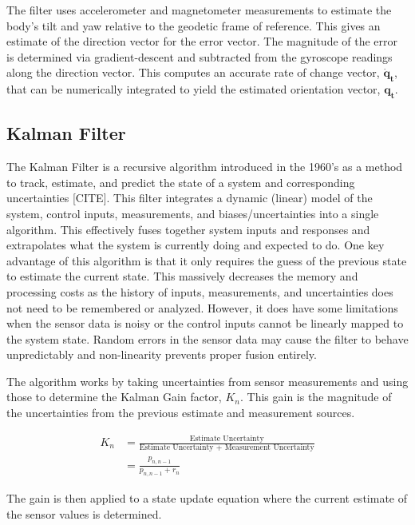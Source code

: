 The filter uses accelerometer and magnetometer measurements to estimate the body's tilt and yaw relative to the geodetic frame of reference.
This gives an estimate of the direction vector for the error vector.
The magnitude of the error is determined via gradient-descent and subtracted from the gyroscope readings along the direction vector.
This computes an accurate rate of change vector, $\pmb{\dot{q}_t}$, that can be numerically integrated to yield the estimated orientation vector, $\pmb{q_t}$.

\subsection{Kalman Filter} \label{ssec:kalman_filter}
The Kalman Filter is a recursive algorithm introduced in the 1960's as a method to track, estimate, and predict the state of a system and corresponding uncertainties [CITE].
This filter integrates a dynamic (linear) model of the system, control inputs, measurements, and biases/uncertainties into a single algorithm.
This effectively fuses together system inputs and responses and extrapolates what the system is currently doing and expected to do.
One key advantage of this algorithm is that it only requires the guess of the previous state to estimate the current state. 
This massively decreases the memory and processing costs as the history of inputs, measurements, and uncertainties does not need to be remembered or analyzed.
However, it does have some limitations when the sensor data is noisy or the control inputs cannot be linearly mapped to the system state.
Random errors in the sensor data may cause the filter to behave unpredictably and non-linearity prevents proper fusion entirely.

The algorithm works by taking uncertainties from sensor measurements and using those to determine the Kalman Gain factor, $K_n$.
This gain is the magnitude of the uncertainties from the previous estimate and measurement sources.

\begin{equation} \label{eq:kalman_gain}
    \begin{aligned}
        K_n &= \frac{\text{Estimate Uncertainty}}{\text{Estimate Uncertainty + Measurement Uncertainty}} \\
            &= \frac{p_{n,n-1}}{p_{n,n-1} + r_n}
    \end{aligned}
\end{equation}

The gain is then applied to a state update equation where the current estimate of the sensor values is determined.

